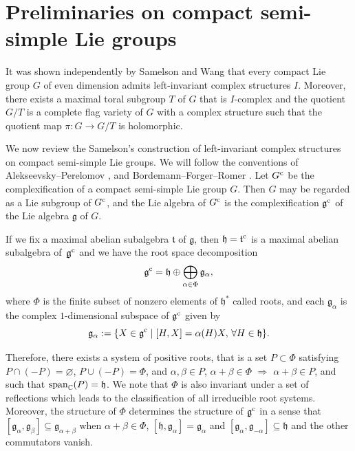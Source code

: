 \section{Preliminaries on compact semi-simple Lie groups}
It was shown independently by Samelson \cite{Samelson} and Wang \cite{Wang} that every compact Lie group $G$ of even dimension admits left-invariant complex structures $I$.
Moreover, there exists a maximal toral subgroup $T$ of $G$ that is $I$-complex and the quotient $G/T$
is a complete flag variety of $G$ with a complex structure such that the quotient map $\pi\colon G \rightarrow G/T$ is holomorphic.

We now review the Samelson's construction of left-invariant complex structures on compact semi-simple Lie groups.
We will follow the conventions of Alekseevsky--Perelomov \cite{AlP}, and Bordemann--Forger--Romer \cite{BFR}.
 Let $G^{\rm c}$ be the complexification of a compact semi-simple Lie group $G$. Then $G$ may be regarded as a Lie subgroup of $G^{\rm c}$, and the Lie algebra of $G^{\rm c}$ is the complexification $\mathfrak g^{\rm c}$ of the Lie algebra $\mathfrak g$ of $G$.

If we fix a maximal abelian subalgebra $\mathfrak t$ of $\mathfrak g$, then $\mathfrak h= \mathfrak t^{\rm c}$ is a maximal abelian subalgebra of~$\mathfrak g^{\rm c}$ and we have the root space decomposition
\[
\mathfrak g^{\rm c} = \mathfrak{h} \oplus \bigoplus_{\alpha \in \Phi} \mathfrak g_{\alpha},
\]
where $\Phi$ is the finite subset of nonzero elements of ${\mathfrak h}^*$ called roots, and each $\mathfrak g_{\alpha}$ is the complex $1$-dimensional subspace of $\mathfrak g^{\rm c} $ given by
\[
\mathfrak g_{\alpha} := \{ X \in {\mathfrak g}^{\rm c} \mid [H , X] = \alpha (H) X, \, \forall H \in \mathfrak{h} \}.
\]

Therefore, there exists a system of positive roots, that is a set $P \subset \Phi$ satisfying $P \cap (- P) = \varnothing$, $ P \cup (-P)=\Phi$, and $\alpha, \beta \in P$, $ \alpha + \beta \in \Phi$ $\Rightarrow$ $\alpha + \beta \in P$, and such that ${\rm {span}}_{\mathbb C}(P) = \mathfrak h$. We note that $\Phi$ is also invariant under a set of reflections which leads to the classification of all irreducible root systems. Moreover, the structure of $\Phi$ determines the structure of $\mathfrak g^{\rm c}$ in a sense that $[\mathfrak g_{\alpha}, \mathfrak g_{\beta}] \subseteq \mathfrak g_{\alpha +\beta}$ when $\alpha+\beta \in \Phi$, $[\mathfrak h,\mathfrak g_{\alpha}] = \mathfrak g_{\alpha}$ and $[\mathfrak g_{\alpha}, \mathfrak g_{-\alpha}] \subseteq \mathfrak h$ and the other commutators vanish.

